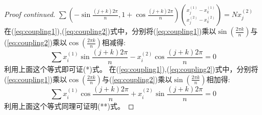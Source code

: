 \documentclass[notheorems,xetex,mathserif,serif]{beamer}
\begin{document}
\begin{frame}
\begin{proof}[Proof continued]
$\sum (-\sin\frac{(j+k)2\pi}{n},1+\cos\frac{(j+k)2\pi}{n})\binom{x_j^{(1)}-x_k^{(1)}}{x_j^{(2)}-x_k^{(2)}}=Nx_j^{(2)}
$\\
在(\ref{eq:coupling1}),(\ref{eq:coupling2})式中，分别将(\ref{eq:coupling1})乘以$\sin(\frac{2\pi k}{n})$与(\ref{eq:coupling2})乘以$\cos(\frac{2\pi k}{n})$相减得:
\begin{equation}
\sum x_i^{(1)}\sin\frac{(j+k)2\pi}{n}-x_i^{(2)}\cos\frac{(j+k)2\pi}{n}=0
\end{equation}
利用上面这个等式即可证(*)式。
在(\ref{eq:coupling1}),(\ref{eq:coupling2})式中，分别将(\ref{eq:coupling1})乘以$\cos(\frac{2\pi k}{n})$与(\ref{eq:coupling2})乘以$\sin(\frac{2\pi k}{n})$相加得:
\begin{equation}
\sum x_i^{(1)}\cos\frac{(j+k)2\pi}{n}+x_i^{(2)}\sin\frac{(j+k)2\pi}{n}=0
\end{equation}
利用上面这个等式同理可证明(**)式。
\end{proof}
\end{frame}
\end{document}
